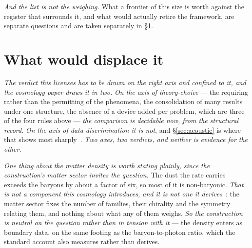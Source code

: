 \documentclass[11pt,a4paper]{article}
\theoremstyle{plain}
\theoremstyle{definition}
\begin{document}
\emph{And the list is not the weighing.} What a frontier of this size is worth against the register that
surrounds it, and what would actually retire the framework, are separate questions and are taken separately
in \S\ref{sec:displace}.



\section{What would displace it}\label{sec:displace}

\emph{The verdict this licenses has to be drawn on the right axis and confined to it, and the cosmology paper
draws it in two.} \emph{On the axis of theory-choice} --- the requiring rather than the permitting of the
phenomena, the consolidation of many results under one structure, the absence of a device added per problem,
which are three of the four rules above --- \emph{the comparison is decidable now, from the structural
record}. \emph{On the axis of data-discrimination it is not}, and \S\ref{sec:acoustic} is where that shows
most sharply~\cite{JanzenCRcosmology}. \emph{Two axes, two verdicts, and neither is evidence for the other.}

\emph{One thing about the matter density is worth stating plainly, since the construction's matter sector
invites the question.} The dust the rate carries exceeds the baryons by about a factor of six, so most of it
is non-baryonic. \emph{That is not a component this cosmology introduces, and it is not one it
derives}~\cite{JanzenCRcosmology}: the matter sector fixes the number of families, their chirality and the
symmetry relating them, and nothing about what any of them weighs. \emph{So the construction is neutral on
the question rather than in tension with it} --- the density enters as boundary data, on the same footing as
the baryon-to-photon ratio, which the standard account also measures rather than derives.
\end{document}
